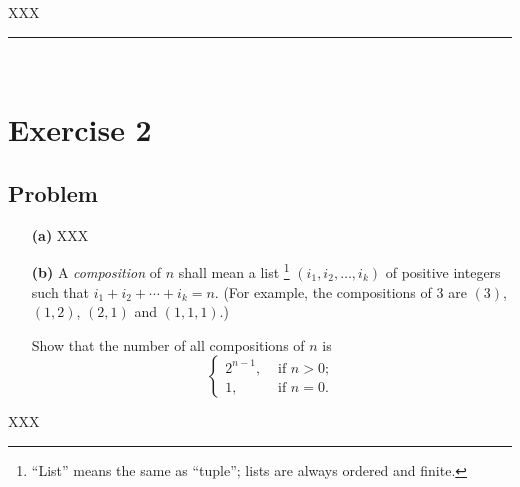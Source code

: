 \documentclass[paper=a4, fontsize=12pt]{scrartcl} %
\newcommand{\tup}[1]{\left( #1 \right)}
\newcommand{\horrule}[1]{\rule{\linewidth}{#1}} %
\theoremstyle{plainsl}
\theoremstyle{definition}
\theoremstyle{remark}
\begin{document}

XXX

\horrule{0.3pt} \\[0.4cm]

\section{Exercise 2}

\subsection{Problem}

\begin{enumerate} %

\item[\textbf{(a)}]
XXX

\item[\textbf{(b)}]
A \textit{composition} of $n$ shall mean a list
\footnote{``List'' means the same as ``tuple'';
          lists are always ordered and finite.}
$\tup{i_1, i_2, \ldots, i_k}$
of positive integers such that $i_1 + i_2 + \cdots + i_k = n$.
(For example, the compositions of $3$ are
$\tup{3}$, $\tup{1, 2}$, $\tup{2, 1}$ and $\tup{1, 1, 1}$.)

Show that the number of all compositions of $n$ is
\[  %
\begin{cases}
2^{n-1}, & \text{ if } n > 0 ; \\
1,       & \text{ if } n = 0 .
\end{cases}
\]
% 
% 

\end{enumerate} %
XXX
\end{document}
